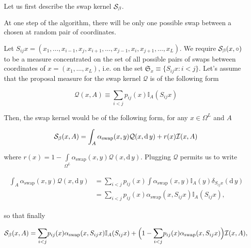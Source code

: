 Let us first describe the swap kernel $\mathcal{S}_{\beta}$. 

\begin{assumptions}[resume]
	\item At one step of the algorithm, there will be only one possible swap between a chosen at random pair of coordinates.
\end{assumptions}

Let $S_{ij} x = (x_1, \dots, x_{i-1}, x_j, x_{i+1}, \dots, x_{j-1}, x_i, x_{j+1}, \dots, x_L)$. We require $\mathcal{S}_{\beta}(x, \circ )$ to be a measure concentrated on the set of all possible pairs of swaps between coordinates of $x = (x_1, \dots, x_L)$, i.e. on the set $\mathfrak{S}_x \equiv \{ S_{ij}x : i < j  \}$. Let's assume that the proposal measure for the swap kernel $\mathcal{Q}$ is of the following form 

\begin{equation*}
	\mathcal{Q}(x, A) \equiv \underset{i < j}{\sum} p_{ij}(x) \mathbb{I}_A (S_{ij} x)
\end{equation*}	 

Then, the swap kernel would be of the following form, for any $x \in \Omega^L$ and $A$

\begin{equation*}
	\mathcal{S}_{\beta}(x,A) = \int_{A} \alpha_\text{swap} (x,y) \mathcal{Q}(x, \mathrm{d}\,y) + r(x) \mathcal{I}(x,A)
\end{equation*}	

where $r(x) = 1 - \underset{\Omega^L}{\int} \alpha_\text{swap} (x,y) \mathcal{Q}(x, \mathrm{d}\,y) $. Plugging $\mathcal{Q}$ permits us to write

\begin{align*}
	\begin{split}
		\int_{A} \alpha_\text{swap} (x,y) \mathcal{Q}(x, \mathrm{d}\,y) &= \underset{ i < j}{\sum} p_{ij}(x) \int \alpha_\text{swap} (x,y) \mathbb{I}_A (y) \delta_{S_{ij}x}(\mathrm{d}\, y) \\ &= \underset{ i < j}{\sum} p_{ij}(x) \alpha_\text{swap} (x, S_{ij}x) \mathbb{I}_A(S_{ij} x),
	\end{split}
\end{align*}	

so that finally

\begin{equation*}
	\mathcal{S}_{\beta}(x,A) = \underset{ i < j}{\sum} p_{ij}(x) \alpha_\text{swap} (x, S_{ij}x) \mathbb{I}_A(S_{ij} x) + \Big( 1 - \underset{ i < j}{\sum} p_{ij}(x) \alpha_\text{swap} (x, S_{ij}x)\Big) \mathcal{I}(x,A),
\end{equation*}	

